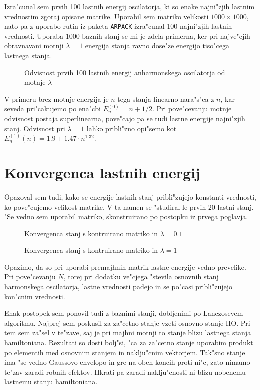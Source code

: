 \documentclass[a4paper,10pt]{article}
\begin{document}
Izra"cunal sem prvih 100 lastnih energij oscilatorja, ki so enake najni"zjih lastnim vrednostim zgoraj opisane matrike. Uporabil sem matriko velikosti $1000\times1000$, nato pa z uporabo rutin iz paketa \texttt{ARPACK} izra"cunal 100 najni"zjih lastnih vrednosti. Uporaba 1000 baznih stanj se mi je zdela primerna, ker pri najve"cjih obravnavani motnji $\lambda=1$ energija stanja ravno dose"ze energijo tiso"cega lastnega stanja. 

\begin{figure}[H]
 \centering

\caption{Odvisnost prvih 100 lastnih energij anharmonskega oscilatorja od motnje $\lambda$}
\label{fig:lastne-energije}
\end{figure}

V primeru brez motnje energija je $n$-tega stanja linearno nara"s"ca z $n$, kar seveda pri"cakujemo po ena"cbi $E_n^{(0)} = n + 1/2$. Pri pove"cevanju motnje odvisnost postaja superlinearna, pove"cajo pa se tudi lastne energije najni"zjih stanj. Odvisnost pri $\lambda=1$ lahko pribli"zno opi"semo kot $E_n^{(1)}(n) = 1.9 + 1.47 \cdot n^{1.32}$. 

\section{Konvergenca lastnih energij}

Opazoval sem tudi, kako se energije lastnih stanj pribli"zujejo konstanti vrednosti, ko pove"cujemo velikost matrike. V ta namen se "studiral le prvih 20 lastni stanj. "Se vedno sem uporabil matriko, skonstruirano po postopku iz prvega poglavja. 

\begin{figure}[H]
\centering

\caption{Konvergenca stanj s kontruirano matriko in $\lambda=0.1$}
\end{figure}

\begin{figure}[H]
\centering

\caption{Konvergenca stanj s kontruirano matriko in $\lambda=1$}
\end{figure}

Opazimo, da so pri uporabi premajhnih matrik lastne energije vedno prevelike. Pri pove"cevanju $N$, torej pri dodatku ve"cjega "stevila osnovnih stanj harmonskega oscilatorja, lastne vrednosti padejo in se po"casi pribli"zujejo kon"cnim vrednosti. 

Enak postopek sem ponovil tudi z baznimi stanji, dobljenimi po Lanczosevem algoritmu. Najprej sem poskusil za za"cetno stanje vzeti osnovno stanje HO. Pri tem sem za"sel v te"zave, saj je pri majhni motnji to stanje blizu lastnega stanja hamiltoniana. Rezultati so dosti bolj"si, "ca za za"cetno stanje uporabim produkt po elementih med osnovnim stanjem in naklju"cnim vektorjem. Tak"sno stanje ima "se vedno Gaussovo envelopo in gre na obeh koncih proti ni"c, zato nimamo te"zav zaradi robnih efektov. Hkrati pa zaradi naklju"cnosti ni blizu nobenemu lastnemu stanju hamiltoniana. 
\end{document}
